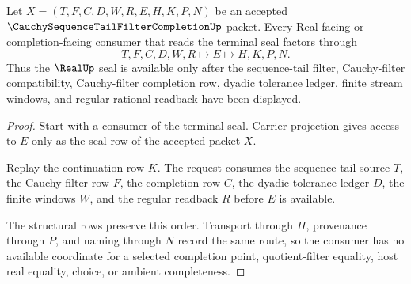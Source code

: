 \begin{theorem}
\label{thm:cauchy-sequence-tail-filter-completion-real-handoff}
Let $X=(T,F,C,D,W,R,E,H,K,P,N)$ be an accepted $\CauchySequenceTailFilterCompletionUp$ packet. Every Real-facing or completion-facing consumer that reads the terminal seal factors through
$$
T,F,C,D,W,R \longmapsto E \longmapsto H,K,P,N .
$$
Thus the $\RealUp$ seal is available only after the sequence-tail filter, Cauchy-filter compatibility, Cauchy-filter completion row, dyadic tolerance ledger, finite stream windows, and regular rational readback have been displayed.
\end{theorem}
\begin{proof}
Start with a consumer of the terminal seal. Carrier projection gives access to $E$ only as the seal row of the accepted packet $X$.

Replay the continuation row $K$. The request consumes the sequence-tail source $T$, the Cauchy-filter row $F$, the completion row $C$, the dyadic tolerance ledger $D$, the finite windows $W$, and the regular readback $R$ before $E$ is available.

The structural rows preserve this order. Transport through $H$, provenance through $P$, and naming through $N$ record the same route, so the consumer has no available coordinate for a selected completion point, quotient-filter equality, host real equality, choice, or ambient completeness.
\end{proof}

